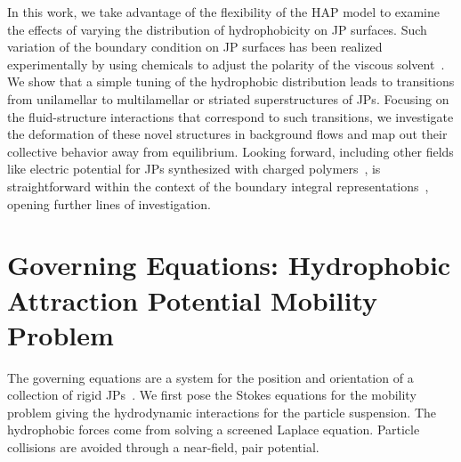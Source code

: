 \documentclass[prb,preprint,showpacs,preprintnumbers,amsmath,amssymb,longbibliography]{revtex4-1}
\begin{document}
In this work, we take advantage of the flexibility of the HAP model to
examine the effects of varying the distribution of hydrophobicity on JP
surfaces. Such variation of the boundary condition on JP surfaces has
been realized experimentally by using chemicals to adjust the polarity
of the viscous solvent~\cite{Zarzaretal2015,
KirillovaMarschelkeSynytska2019, doi:10.1021/la503455h}. We show that a
simple tuning of the hydrophobic distribution leads to transitions from
unilamellar to multilamellar or striated superstructures of JPs.
Focusing on the fluid-structure interactions that correspond to such
transitions, we investigate the deformation of these novel structures in
background flows and map out their collective behavior away from
equilibrium. Looking forward, including other fields like electric
potential for JPs synthesized with charged
polymers~\cite{HongCacciutoLuijtenGranick2008, doi:10.1021/la503455h,
KangHonciuc2018}, is straightforward within the context of the boundary
integral representations~\cite{kohl-cor-che-vee22}, opening further
lines of investigation.

\section{Governing Equations: Hydrophobic Attraction Potential Mobility Problem} 
The governing equations are a system for the position and
orientation of a collection of rigid JPs~\cite{Fu2022_JFM}.
We first pose the
Stokes equations for the mobility problem giving the hydrodynamic
interactions for the particle suspension. The hydrophobic forces come
from solving a screened Laplace equation. Particle collisions are
avoided through a near-field, pair potential.

\end{document}

